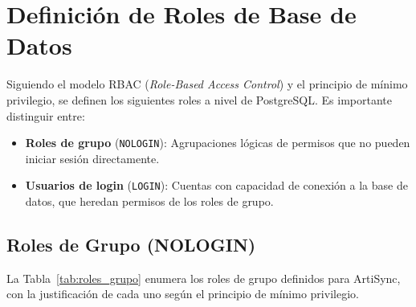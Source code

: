 \documentclass[conference, onecolumn]{IEEEtran}
\begin{document}
\section{Definición de Roles de Base de Datos}

Siguiendo el modelo RBAC (\textit{Role-Based Access Control}) y el principio de mínimo privilegio, se definen los siguientes roles a nivel de PostgreSQL. Es importante distinguir entre:

\begin{itemize}
    \item \textbf{Roles de grupo} (\texttt{NOLOGIN}): Agrupaciones lógicas de permisos que no pueden iniciar sesión directamente.
    \item \textbf{Usuarios de login} (\texttt{LOGIN}): Cuentas con capacidad de conexión a la base de datos, que heredan permisos de los roles de grupo.
\end{itemize}

\subsection{Roles de Grupo (NOLOGIN)}

La Tabla~\ref{tab:roles_grupo} enumera los roles de grupo definidos para ArtiSync, con la justificación de cada uno según el principio de mínimo privilegio.
\end{document}

